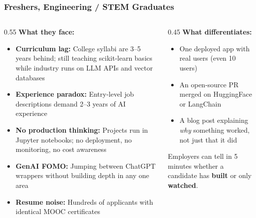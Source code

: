 \begin{frame}[fragile]\frametitle{Freshers, Engineering / STEM Graduates}

\begin{columns}
    \begin{column}[T]{0.55\linewidth}
\textbf{What they face:}
\begin{itemize}
\item \textbf{Curriculum lag:} College syllabi are 3--5 years behind; still teaching scikit-learn basics while industry runs on LLM APIs and vector databases
\item \textbf{Experience paradox:} Entry-level job descriptions demand 2--3 years of AI experience
\item \textbf{No production thinking:} Projects run in Jupyter notebooks; no deployment, no monitoring, no cost awareness
\item \textbf{GenAI FOMO:} Jumping between ChatGPT wrappers without building depth in any one area
\item \textbf{Resume noise:} Hundreds of applicants with identical MOOC certificates
\end{itemize}
    \end{column}
    \begin{column}[T]{0.45\linewidth}
\textbf{What differentiates:}

\begin{itemize}
\item One deployed app with real users (even 10 users)
\item An open-source PR merged on HuggingFace or LangChain
\item A blog post explaining \textit{why} something worked, not just that it did
\end{itemize}

\vspace{0.2cm}
{\small Employers can tell in 5 minutes whether a candidate has \textbf{built} or only \textbf{watched}.}
    \end{column}
\end{columns}

\end{frame}


